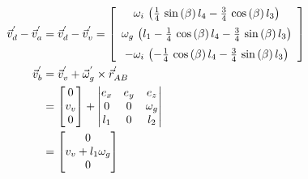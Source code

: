 \begin{align*}
\vec{v}_{d}^{'}-\vec{v}_{a}^{'}&=\vec{v}_{d}^{'}-\vec{v}_{v}^{'}=
\left[ \begin {array}{c} \omega_{i}\, \left( \frac{1}{4}\,\sin \left( \beta \right) l_{4}-\frac{3}{4}\,\cos \left( \beta \right) l_{3} \right) \\
\noalign{\medskip}\omega_{g}\, \left( l_{1}-\frac{1}{4}\,\cos \left( \beta \right) l_{4}-\frac{3}{4}\,\sin \left( \beta \right) l_{3} \right)\\
\noalign{\medskip}-\omega_{i}\, \left( -\frac{1}{4}\,\cos \left( \beta \right) l_{4}-\frac{3}{4}\,\sin \left( \beta \right) l_{3} \right)\end {array} \right]\\
\vec{v}_{b}^{'}&=\vec{v}_{v}^{'}+\vec{\omega}_{g}^{'}\times\vec{r}_{AB}^{'}\\
&=\begin{bmatrix}
0\\
v_{v}\\
0\\
\end{bmatrix}
+\begin{vmatrix}
e_{x}&e_{y}&e_{z}\\
0&0&\omega_{g}\\
l_{1}&0&l_{2}\\
\end{vmatrix}\\
&=\begin{bmatrix}
0\\
v_{v}+l_{1}\omega_{g}\\
0\\
\end{bmatrix}
\end{align*}
\newpage